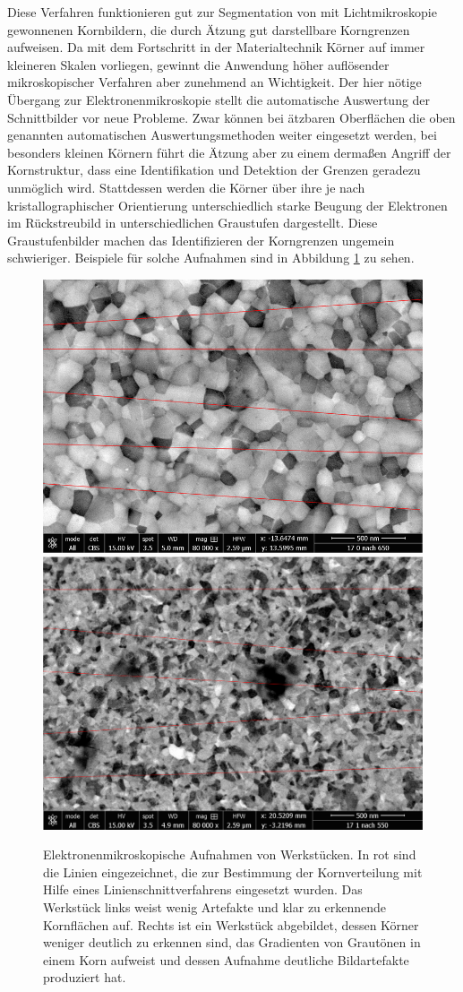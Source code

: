 \documentclass[
  12pt,
]{book}
\begin{document}
Diese Verfahren funktionieren gut zur Segmentation von mit Lichtmikroskopie gewonnenen Kornbildern, die durch Ätzung gut darstellbare Korngrenzen aufweisen.
Da mit dem Fortschritt in der Materialtechnik Körner auf immer kleineren Skalen vorliegen, gewinnt die Anwendung höher auflösender mikroskopischer Verfahren aber zunehmend an Wichtigkeit. Der hier nötige Übergang zur Elektronenmikroskopie stellt die automatische Auswertung der Schnittbilder vor neue Probleme. Zwar können bei ätzbaren Oberflächen die oben genannten automatischen Auswertungsmethoden weiter eingesetzt werden, bei besonders kleinen Körnern führt die Ätzung aber zu einem dermaßen Angriff der Kornstruktur, dass eine Identifikation und Detektion der Grenzen geradezu unmöglich wird.
Stattdessen werden die Körner über ihre je nach kristallographischer Orientierung unterschiedlich starke Beugung der Elektronen im Rückstreubild in unterschiedlichen Graustufen dargestellt. Diese Graustufenbilder machen das Identifizieren der Korngrenzen ungemein schwieriger. Beispiele für solche Aufnahmen sind in Abbildung \ref{fig:electroGrain} zu sehen.





\begin{figure}

{\centering \includegraphics[width=.45\textwidth]{../imgs/out1} \includegraphics[width=.45\textwidth]{../imgs/out2} 

}

\caption[Elektronenmikroskopische Aufnahmen von Werkstücken.]{Elektronenmikroskopische Aufnahmen von Werkstücken. In rot sind die Linien eingezeichnet, die zur Bestimmung der Kornverteilung mit Hilfe eines Linienschnittverfahrens eingesetzt wurden. Das Werkstück links weist wenig Artefakte und klar zu erkennende Kornflächen auf. Rechts ist ein Werkstück abgebildet, dessen Körner weniger deutlich zu erkennen sind, das Gradienten von Grautönen in einem Korn aufweist und dessen Aufnahme deutliche Bildartefakte produziert hat.}\label{fig:electroGrain}
\end{figure}
\end{document}
